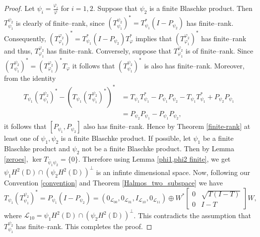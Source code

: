 \documentclass[12pt, a4 paper]{amsart}
\newcommand{\cll}{\mathcal{L}}
\newcommand{\D}{\mathbb{D}}
\theoremstyle{definition}
\theoremstyle{plain}
\theoremstyle{definition}
\numberwithin{equation}{section}
\let\phi=\varphi
\begin{document}
\begin{proof}
Let $\psi_i=\frac{\phi_i}{\phi}$ for $i=1,2$. Suppose that $\psi_2$ is a finite Blaschke product. Then $T_{\psi_1}^{\psi_2}$ is clearly of finite--rank, since
$(T_{\psi_1}^{\psi_2})^*=T_{\psi_1}^*(I-P_{\psi_2})$ has finite--rank. Consequently, $(T_{\phi_1}^{\phi_2})^*=T_{\psi_1}^*(I-P_{\psi_2})T_{\phi}^*$ implies that $(T_{\phi_1}^{\phi_2})^*$ has finite--rank and thus, $T_{\phi_1}^{\phi_2}$ has finite--rank. Conversely, suppose that $T^{\phi_2}_{\phi_1}$ is of finite--rank. Since $(T_{\psi_1}^{\psi_2})^*=(T^{\phi_2}_{\phi_1})^*T_{\phi}$ it follows that $(T_{\psi_1}^{\psi_2})^*$ is also has finite--rank. Moreover, from the identity 
\begin{align*}
T_{\psi_1}(T_{\psi_1}^{\psi_2})^*-\left(T_{\psi_1}(T_{\psi_1}^{\psi_2})^*\right)^*&=T_{\psi_1}T^*_{\psi_1}-P_{\psi_1}P_{\psi_2}-T_{\psi_1}T^*_{\psi_1}+P_{\psi_2}P_{\psi_1}\\
&=P_{\psi_2}P_{\psi_1}-P_{\psi_1}P_{\psi_2},
\end{align*}
it follows that $[P_{\psi_1},P_{\psi_2}]$ also has finite--rank. Hence by Theorem \ref{finite-rank} at least one of $\psi_1,\psi_2$ is a finite Blaschke product. If possible, let $\psi_1$ be a finite Blaschke product and $\psi_2$ not be a finite Blaschke product. Then by Lemma \ref{zeroes}, $\ker T_{\bar\psi_1\psi_2}=\{0\}$. Therefore using Lemma \ref{phi1,phi2 finite}, we get $\psi_1 H^2(\D)\cap (\psi_2 H^2(\D))^\perp$ is an infinte dimensional space. Now, following our Convention \ref{convention} and Theorem \ref{Halmos_two_subspace}  we have
\begin{equation*}
T_{\psi_1}(T_{\psi_1}^{\psi_2})^*=P_{\psi_1}(I-P_{\psi_2})=(0_{\cll_{00}},0_{\cll_{01}},I_{\cll_{10}},0_{\cll_{11}})\oplus {W}^*\begin{bmatrix}
            0 & {\sqrt{T(I - T)}}\\
             0 & {I -T}
        \end{bmatrix}{W},
\end{equation*}
where $\cll_{10}=\psi_1 H^2(\D)\cap (\psi_2 H^2(\D))^\perp$. This contradicts the assumption that $T_{\psi_1}^{\psi_2}$ has finite--rank. This completes the proof.
\end{proof}
\end{document}
